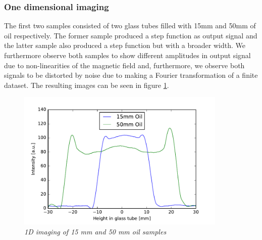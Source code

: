 \subsubsection{One dimensional imaging}
The first two samples consisted of two glass tubes filled with 15mm and 50mm of oil respectively. The former sample produced a step function as output signal and the latter sample also  produced a step function but with a broader width. We furthermore observe both samples to show different amplitudes in output signal due to non-linearities of the magnetic field and, furthermore, we observe both signals to be distorted by noise due to making a Fourier transformation of a finite dataset. The resulting images can be seen in figure \ref{fig:11}.
\begin{figure}[h]
	\includegraphics[width=100mm]{1DOilSamples}	
	\centering
	\caption{\itshape 1D imaging of 15 mm and 50 mm oil samples }
	\label{fig:11}
\end{figure}

